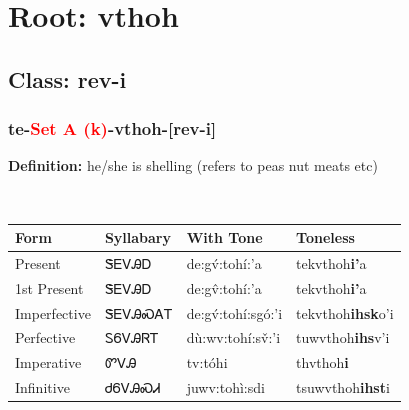 \needspace{4in}
\section*{Root: vthoh}
\nopagebreak
{}
\needspace{3in}
\subsection*{Class: rev-i}
\nopagebreak
\needspace{2in}
\subsubsection*{te{-}\textcolor{Red}{Set A (k)}{-}\textbf{vthoh}{-}[rev-i]}
\nopagebreak
\textbf{Definition: } he/she is shelling (refers to peas{\quotesinglbase} nut meats{\quotesinglbase} etc)
\\[0.5em]
\begin{tabularx}{\textwidth}{l X X X}%
\toprule%
\textbf{Form}&\textbf{Syllabary}&\textbf{With Tone}&\textbf{Toneless}\\%
\midrule%
Present&ᏕᎬᏙᎯᎠ&de:gv́:tohí:’a&tekvthoh\textbf{i'}a\\%
1st Present&ᏕᎬᏙᎯᎠ&de:gv̂:tohí:’a&tekvthoh\textbf{i'}a\\%
Imperfective&ᏕᎬᏙᎯᏍᎪᎢ&de:gv́:tohí:sgó:’i&tekvthoh\textbf{ihsk}o'i\\%
Perfective&ᏚᏮᏙᎯᏒᎢ&dù:wv:tohí:sv̌:’i&tuwvthoh\textbf{ihs}v'i\\%
Imperative&ᏛᏙᎯ&tv:tóhi&thvthoh\textbf{i}\\%
Infinitive&ᏧᏮᏙᎯᏍᏗ&juwv:tohì:sdi&tsuwvthoh\textbf{ihst}i\\%
\bottomrule%
\end{tabularx}
\\[1em]